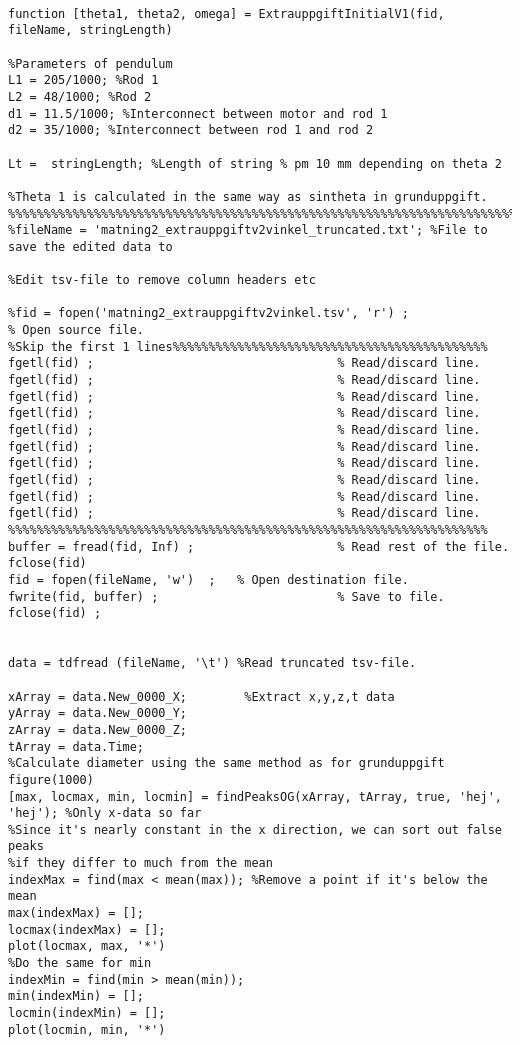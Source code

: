 \begin{lstlisting}[style=Matlab-editor]

function [theta1, theta2, omega] = ExtrauppgiftInitialV1(fid, fileName, stringLength)

%Parameters of pendulum
L1 = 205/1000; %Rod 1
L2 = 48/1000; %Rod 2
d1 = 11.5/1000; %Interconnect between motor and rod 1
d2 = 35/1000; %Interconnect between rod 1 and rod 2 

Lt =  stringLength; %Length of string % pm 10 mm depending on theta 2

%Theta 1 is calculated in the same way as sintheta in grunduppgift. 
%%%%%%%%%%%%%%%%%%%%%%%%%%%%%%%%%%%%%%%%%%%%%%%%%%%%%%%%%%%%%%%%%%%%%%%%%%%%%%%%%%%%%%%%%%%%%%%%%
%fileName = 'matning2_extrauppgiftv2vinkel_truncated.txt'; %File to save the edited data to

%Edit tsv-file to remove column headers etc

%fid = fopen('matning2_extrauppgiftv2vinkel.tsv', 'r') ;              % Open source file.
%Skip the first 1 lines%%%%%%%%%%%%%%%%%%%%%%%%%%%%%%%%%%%%%%%%%%%% 
fgetl(fid) ;                                  % Read/discard line.
fgetl(fid) ;                                  % Read/discard line.
fgetl(fid) ;                                  % Read/discard line.
fgetl(fid) ;                                  % Read/discard line.
fgetl(fid) ;                                  % Read/discard line.
fgetl(fid) ;                                  % Read/discard line.
fgetl(fid) ;                                  % Read/discard line.
fgetl(fid) ;                                  % Read/discard line.
fgetl(fid) ;                                  % Read/discard line.
fgetl(fid) ;                                  % Read/discard line.
%%%%%%%%%%%%%%%%%%%%%%%%%%%%%%%%%%%%%%%%%%%%%%%%%%%%%%%%%%%%%%%%%%% 
buffer = fread(fid, Inf) ;                    % Read rest of the file.
fclose(fid)
fid = fopen(fileName, 'w')  ;   % Open destination file.
fwrite(fid, buffer) ;                         % Save to file.
fclose(fid) ;


data = tdfread (fileName, '\t') %Read truncated tsv-file.

xArray = data.New_0000_X;        %Extract x,y,z,t data
yArray = data.New_0000_Y;
zArray = data.New_0000_Z;
tArray = data.Time;
%Calculate diameter using the same method as for grunduppgift
figure(1000)
[max, locmax, min, locmin] = findPeaksOG(xArray, tArray, true, 'hej', 'hej'); %Only x-data so far
%Since it's nearly constant in the x direction, we can sort out false peaks
%if they differ to much from the mean
indexMax = find(max < mean(max)); %Remove a point if it's below the mean
max(indexMax) = [];
locmax(indexMax) = [];
plot(locmax, max, '*')
%Do the same for min
indexMin = find(min > mean(min)); 
min(indexMin) = [];
locmin(indexMin) = [];
plot(locmin, min, '*')


\end{lstlisting}
